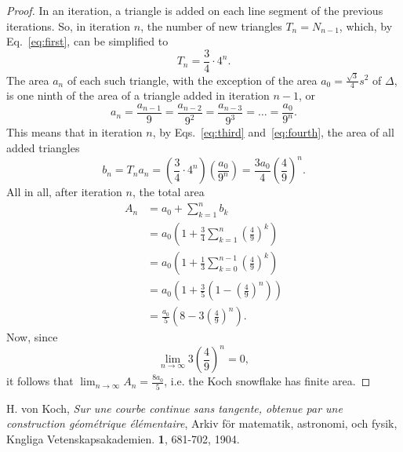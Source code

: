\documentclass[12pt, a4paper]{article}
\newcommand{\ubersum}[2] {
	\sum_{k=#2}^{n#1}
}
\begin{document}
\begin{proof}
In an iteration, a triangle is added on each line segment of the
previous iterations. So, in iteration $n$, the number of new triangles
$T_n = N_{n-1}$, which, by Eq.~\ref{eq:first}, can be simplified to
\begin{equation}\label{eq:third}
	T_n = \frac 3 4 \cdot 4^n.
\end{equation}
The area $a_n$ of each such triangle, with the exception of the area
$a_0 = \frac {\sqrt 3} 4 s^2$ of $\Delta$, is one ninth of the area of a 
triangle added in iteration $n - 1$, or
%
\begin{equation}\label{eq:fourth}
	a_n = \frac {a_{n-1}} {9}
		= \frac {a_{n-2}} {9^2}
		= \frac {a_{n-3}} {9^3}
		= \ldots
		= \frac {a_0} {9^n}.
\end{equation}
This means that in iteration $n$, by Eqs.~\ref{eq:third} and~\ref{eq:fourth}, the area of all added
triangles
$$b_n = T_na_n = \left (
		\frac 3 4 \cdot 4^n
	\right )
	\left (
		\frac {a_0} {9^n}
	\right ) = \frac {3a_0} 4 \left (
	\frac 4 9
	\right )^n.$$
All in all, after iteration $n$, the total area
\begin{align*}
	A_n &= a_0 + \ubersum{}{1} b_k \\
		&= a_0 \left (
				1 + \frac 3 4 \ubersum{}{1}\left(\frac 4 9 \right )^k
			\right ) \\
		&= a_0 \left (
				1 + \frac 1 3 \ubersum{-1}{0}\left(\frac 4 9 \right )^k
			\right ) \\
		&= a_0 \left (
				1 + \frac 3 5 \left ( 1 - \left( \frac 4 9 \right )^n \right )
			\right ) \\
		&= \frac {a_0} 5 \left (
				8 - 3 \left ( \frac 4 9 \right )^n
			\right ).
\end{align*}
Now, since
$$
	\lim_{n \to \infty} 3 \left ( \frac 4 9 \right )^n = 0,
$$
it follows that $\lim_{n \to \infty} A_n = \frac {8a_0} 5$, i.e. the Koch 
snowflake has finite area. 
\end{proof}
\begin{thebibliography}{99}
		H. von Koch,
		\emph{Sur une courbe continue sans tangente, obtenue par une
		construction géométrique élémentaire},
		Arkiv för matematik, astronomi, och fysik, Kngliga Vetenskapsakademien.
		{\bf 1},
		681-702,
		1904.
\end{thebibliography}

%
\end{document}
